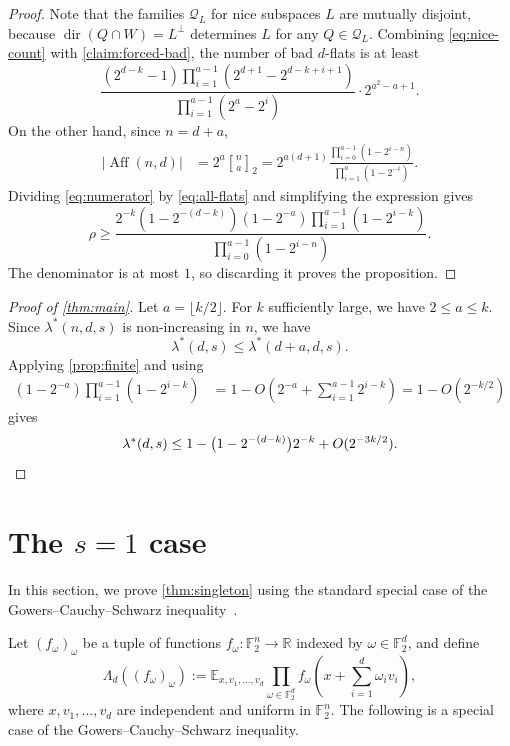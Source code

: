 \documentclass[reqno]{amsart}
\theoremstyle{definition}
\theoremstyle{remark}
\newcommand{\F}{\mathbb F}
\newcommand{\R}{\mathbb R}
\newcommand{\E}{\mathbb E}
\newcommand{\cQ}{\mathcal Q}
\newcommand{\qbinom}[2]{\genfrac{[}{]}{0pt}{}{#1}{#2}_{\!2}}
\DeclareMathOperator{\Aff}{Aff}
\DeclareMathOperator{\dir}{dir}
\begin{document}
\begin{proof}
Note that the families $\cQ_L$ for nice subspaces $L$ are
mutually disjoint, because $\dir(Q\cap W)=L^\perp$ determines $L$ for any $Q\in\cQ_L$.
Combining \eqref{eq:nice-count} with \cref{claim:forced-bad}, the
number of bad $d$-flats is at least
\begin{equation}\label{eq:numerator}
      \frac{(2^{d-k}-1)
    \prod_{i=1}^{a-1}(2^{d+1}-2^{d-k+i+1})}
  {\prod_{i=1}^{a-1}(2^a-2^i)}
  \cdot2^{a^2-a+1}.
\end{equation}
On the other hand, since $n=d+a$,
\begin{equation}\label{eq:all-flats}
\begin{split}
  |\Aff(n,d)|
  &=2^a\qbinom{n}{a}=2^{a(d+1)}
    \frac{\prod_{i=0}^{a-1}(1-2^{i-n})}
         {\prod_{i=1}^{a}(1-2^{-i})}.
\end{split}
\end{equation}
Dividing \eqref{eq:numerator} by \eqref{eq:all-flats} and simplifying the expression gives
\[
  \rho\ge
  \frac{2^{-k}(1-2^{-(d-k)})(1-2^{-a})
  \prod_{i=1}^{a-1}(1-2^{i-k})}
  {\prod_{i=0}^{a-1}(1-2^{i-n})}.
\]
The denominator is at most $1$, so discarding it proves the proposition.
\end{proof}

\begin{proof}[Proof of \cref{thm:main}]
Let $a=\lfloor k/2\rfloor$.  For $k$ sufficiently large, we have
$2\le a\le k$.  Since $\lambda^*(n,d,s)$ is non-increasing in $n$, we have
\[
  \lambda^*(d,s)\le\lambda^*(d+a,d,s).
\]
Applying \cref{prop:finite} and using
\[
\begin{split}
  (1-2^{-a})\prod_{i=1}^{a-1}(1-2^{i-k})
  &=1-O\left(2^{-a}+\sum_{i=1}^{a-1}2^{i-k}\right)=1-O(2^{-k/2})
\end{split}
\]
gives
\[
  \lambda^*(d,s)
  \le1-\bigl(1-2^{-(d-k)}\bigr)2^{-k}
  +O(2^{-3k/2}).\qedhere
\]
\end{proof}

\section{The $s=1$ case}\label{sec:singleton-proof}
In this section, we prove \cref{thm:singleton} using the standard special case of the
Gowers--Cauchy--Schwarz inequality~\cite{Gowers2001}.


Let $(f_\omega)_\omega$ be a tuple of functions $f_\omega:\F_2^n\to\R$ indexed by
$\omega\in\F_2^d$, and define
\[
  \Lambda_d((f_\omega)_\omega)
  :=\E_{x,v_1,\ldots,v_d}
    \prod_{\omega\in\F_2^d}
    f_\omega\left(x+\sum_{i=1}^d\omega_i v_i\right),
\]
where $x,v_1,\ldots,v_d$ are independent and uniform in $\F_2^n$.
The following is a special case of the Gowers--Cauchy--Schwarz inequality.
\end{document}
